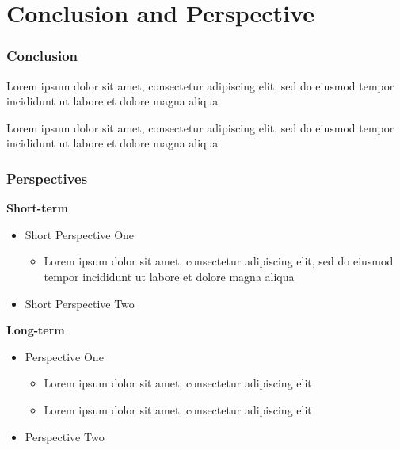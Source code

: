 
\section{Conclusion and Perspective}

\begin{frame}
    \frametitle{Conclusion}

    \begin{myitemize}
        \item Lorem ipsum dolor sit amet, consectetur adipiscing elit, sed do eiusmod tempor incididunt ut labore et dolore magna aliqua
        \item Lorem ipsum dolor sit amet, consectetur adipiscing elit, sed do eiusmod tempor incididunt ut labore et dolore magna aliqua
    \end{myitemize}

\end{frame}

\begin{frame}
    \frametitle{Perspectives}

    \textbf{Short-term}
    \begin{itemize}
        \item Short Perspective One
        \begin{itemize}
            \item Lorem ipsum dolor sit amet, consectetur adipiscing elit, sed do eiusmod tempor incididunt ut labore et dolore magna aliqua
        \end{itemize}
        \item Short Perspective Two
    \end{itemize}

    \vspace{0.5cm}

    \textbf{Long-term}
    \begin{itemize}
        \item Perspective One
        \begin{itemize}
            \item Lorem ipsum dolor sit amet, consectetur adipiscing elit
            \item Lorem ipsum dolor sit amet, consectetur adipiscing elit
        \end{itemize}
        \item Perspective Two
    \end{itemize}

\end{frame}